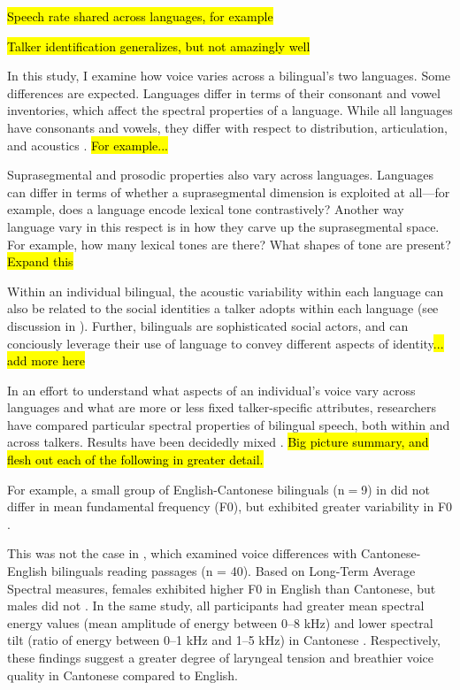 \hl{Speech rate shared across languages, for example}

\hl{Talker identification generalizes, but not amazingly well} %

In this study, I examine how voice varies across a bilingual's two languages. Some differences are expected. Languages differ in terms of their consonant and vowel inventories, which affect the spectral properties of a language. While all languages have consonants and vowels, they differ with respect to distribution, articulation, and acoustics . \hl{For example...}

Suprasegmental and prosodic properties also vary across languages. Languages can differ in terms of whether a suprasegmental dimension is exploited at all---for example, does a language encode lexical tone contrastively? Another way language vary in this respect is in how they carve up the suprasegmental space. For example, how many lexical tones are there? What shapes of tone are present? \hl{Expand this}

Within an individual bilingual, the acoustic variability within each language can also be related to the social identities a talker adopts within each language (see discussion in \citet{cheng_2020_f0}). Further, bilinguals are sophisticated social actors, and can conciously leverage their use of language to convey different aspects of identity\hl{... add more here}

In an effort to understand what aspects of an individual's voice vary across languages and what are more or less fixed talker-specific attributes, researchers have compared particular spectral properties of bilingual speech, both within and across talkers. Results have been decidedly mixed \citep{cheng_2020_f0,altenberg_2006_f0,ryabov_2016_self}. \hl{Big picture summary, and flesh out each of the following in greater detail.}

For example, a small group of English-Cantonese bilinguals (n$=$9) in did not differ in mean fundamental frequency (F0), but exhibited greater variability in F0 \citep{altenberg_2006_f0}. 

This was not the case in \citet{ng_2012_ltas}, which examined voice differences with Cantonese-English bilinguals reading passages (n = 40). Based on Long-Term Average Spectral measures, females exhibited higher F0 in English than Cantonese, but males did not \citep{ng_2012_ltas}. In the same study, all participants had greater mean spectral energy values (mean amplitude of energy between 0--8 kHz) and lower spectral tilt (ratio of energy between 0--1 kHz and 1--5 kHz) in Cantonese \citep{ng_2012_ltas}. Respectively, these findings suggest a greater degree of laryngeal tension and breathier voice quality in Cantonese compared to English.

